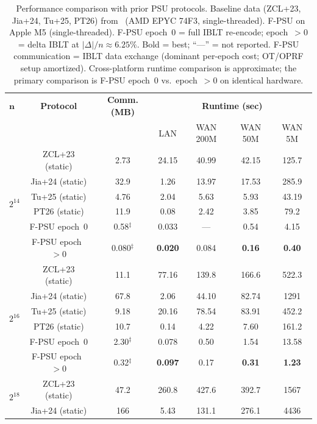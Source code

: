 \documentclass[letterpaper,twocolumn,10pt]{article}
\theoremstyle{definition}
\begin{document}
\begin{table}[t]
\centering
\footnotesize
\caption{Performance comparison with prior PSU protocols. Baseline data
(ZCL+23, Jia+24, Tu+25, PT26) from~\cite{PT26} (AMD EPYC 74F3,
single-threaded). F-PSU on Apple M5 (single-threaded).
F-PSU epoch~0 = full IBLT re-encode; epoch~$>$0 = delta IBLT at
$|\Delta|/n \approx 6.25\%$. Bold = best; ``---'' = not reported.
F-PSU communication = IBLT data exchange (dominant per-epoch cost;
OT/OPRF setup amortized). Cross-platform runtime comparison is
approximate; the primary comparison is F-PSU epoch~0 vs.\ epoch~$>$0
on identical hardware.}
\label{tab:main-perf}
\begin{tabular}{lcccccc}
\toprule
$\mathbf{n}$ & \textbf{Protocol} & \textbf{Comm. (MB)} & \multicolumn{4}{c}{\textbf{Runtime (sec)}} \\
             &                   &                    & LAN & WAN 200M & WAN 50M & WAN 5M \\
\midrule
\multirow{6}{*}{$2^{14}$}
& ZCL+23 (static)      & 2.73  & 24.15 & 40.99 & 42.15 & 125.7 \\
& Jia+24 (static)      & 32.9  & 1.26  & 13.97 & 17.53 & 285.9 \\
& Tu+25 (static)       & 4.76  & 2.04  & 5.63  & 5.93  & 43.19 \\
& PT26 (static)        & 11.9  & 0.08  & 2.42  & 3.85  & 79.2 \\
& F-PSU epoch~0        & 0.58$^\ddagger$  & 0.033 & ---   & 0.54  & 4.15 \\
& F-PSU epoch~$>$0     & 0.080$^\ddagger$ & \textbf{0.020} & 0.084 & \textbf{0.16} & \textbf{0.40} \\
\midrule
\multirow{6}{*}{$2^{16}$}
& ZCL+23 (static)      & 11.1  & 77.16 & 139.8 & 166.6 & 522.3 \\
& Jia+24 (static)      & 67.8  & 2.06  & 44.10 & 82.74 & 1291 \\
& Tu+25 (static)       & 9.18  & 20.16 & 78.54 & 83.91 & 452.2 \\
& PT26 (static)        & 10.7  & 0.14  & 4.22  & 7.60  & 161.2 \\
& F-PSU epoch~0        & 2.30$^\ddagger$  & 0.078 & 0.50  & 1.54  & 13.58 \\
& F-PSU epoch~$>$0     & 0.32$^\ddagger$  & \textbf{0.097} & 0.17 & \textbf{0.31} & \textbf{1.23} \\
\midrule
\multirow{6}{*}{$2^{18}$}
& ZCL+23 (static)      & 47.2  & 260.8 & 427.6 & 392.7 & 1567 \\
& Jia+24 (static)      & 166   & 5.43  & 131.1 & 276.1 & 4436 \\

\end{tabular}
\end{table}
\end{document}
